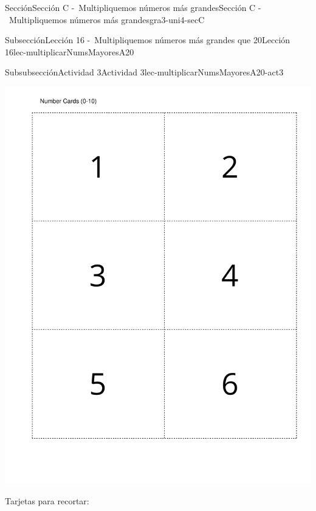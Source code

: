 \begin{sectionptx}{Sección}{Sección C -~Multipliquemos números más grandes}{}{Sección C -~Multipliquemos números más grandes}{}{}{gra3-uni4-secC}
\begin{subsectionptx}{Subsección}{Lección 16 -~Multipliquemos números más grandes que 20}{}{Lección 16}{}{}{lec-multiplicarNumsMayoresA20}
\begin{subsubsectionptx}{Subsubsección}{Actividad 3}{}{Actividad 3}{}{}{lec-multiplicarNumsMayoresA20-act3}
\begin{cutoutpage}
\begin{image}{0}{1}{0}{}
\includegraphics[page=2, rotate=90, scale=0.55, trim=40 40 20 40, clip, center] {external/blm/pdf-source/tarjetasDeDigitos.pdf}
\end{image}%
\cleardoublepage
Tarjetas para recortar:
\begin{image}{0}{1}{0}{}%

\end{image}
\end{cutoutpage}
\end{subsubsectionptx}
\end{subsectionptx}
\end{sectionptx}
